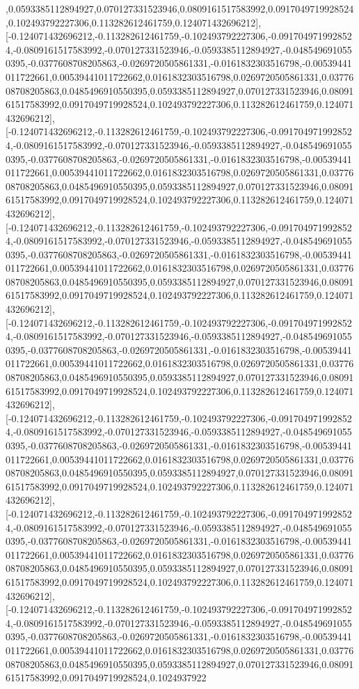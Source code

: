\documentclass{article}
\begin{document}
,0.0593385112894927,0.070127331523946,0.0809161517583992,0.0917049719928524,0.102493792227306,0.113282612461759,0.124071432696212],[-0.124071432696212,-0.113282612461759,-0.102493792227306,-0.0917049719928524,-0.0809161517583992,-0.070127331523946,-0.0593385112894927,-0.0485496910550395,-0.0377608708205863,-0.0269720505861331,-0.0161832303516798,-0.00539441011722661,0.00539441011722662,0.0161832303516798,0.0269720505861331,0.0377608708205863,0.0485496910550395,0.0593385112894927,0.070127331523946,0.0809161517583992,0.0917049719928524,0.102493792227306,0.113282612461759,0.124071432696212],[-0.124071432696212,-0.113282612461759,-0.102493792227306,-0.0917049719928524,-0.0809161517583992,-0.070127331523946,-0.0593385112894927,-0.0485496910550395,-0.0377608708205863,-0.0269720505861331,-0.0161832303516798,-0.00539441011722661,0.00539441011722662,0.0161832303516798,0.0269720505861331,0.0377608708205863,0.0485496910550395,0.0593385112894927,0.070127331523946,0.0809161517583992,0.0917049719928524,0.102493792227306,0.113282612461759,0.124071432696212],[-0.124071432696212,-0.113282612461759,-0.102493792227306,-0.0917049719928524,-0.0809161517583992,-0.070127331523946,-0.0593385112894927,-0.0485496910550395,-0.0377608708205863,-0.0269720505861331,-0.0161832303516798,-0.00539441011722661,0.00539441011722662,0.0161832303516798,0.0269720505861331,0.0377608708205863,0.0485496910550395,0.0593385112894927,0.070127331523946,0.0809161517583992,0.0917049719928524,0.102493792227306,0.113282612461759,0.124071432696212],[-0.124071432696212,-0.113282612461759,-0.102493792227306,-0.0917049719928524,-0.0809161517583992,-0.070127331523946,-0.0593385112894927,-0.0485496910550395,-0.0377608708205863,-0.0269720505861331,-0.0161832303516798,-0.00539441011722661,0.00539441011722662,0.0161832303516798,0.0269720505861331,0.0377608708205863,0.0485496910550395,0.0593385112894927,0.070127331523946,0.0809161517583992,0.0917049719928524,0.102493792227306,0.113282612461759,0.124071432696212],[-0.124071432696212,-0.113282612461759,-0.102493792227306,-0.0917049719928524,-0.0809161517583992,-0.070127331523946,-0.0593385112894927,-0.0485496910550395,-0.0377608708205863,-0.0269720505861331,-0.0161832303516798,-0.00539441011722661,0.00539441011722662,0.0161832303516798,0.0269720505861331,0.0377608708205863,0.0485496910550395,0.0593385112894927,0.070127331523946,0.0809161517583992,0.0917049719928524,0.102493792227306,0.113282612461759,0.124071432696212],[-0.124071432696212,-0.113282612461759,-0.102493792227306,-0.0917049719928524,-0.0809161517583992,-0.070127331523946,-0.0593385112894927,-0.0485496910550395,-0.0377608708205863,-0.0269720505861331,-0.0161832303516798,-0.00539441011722661,0.00539441011722662,0.0161832303516798,0.0269720505861331,0.0377608708205863,0.0485496910550395,0.0593385112894927,0.070127331523946,0.0809161517583992,0.0917049719928524,0.102493792227306,0.113282612461759,0.124071432696212],[-0.124071432696212,-0.113282612461759,-0.102493792227306,-0.0917049719928524,-0.0809161517583992,-0.070127331523946,-0.0593385112894927,-0.0485496910550395,-0.0377608708205863,-0.0269720505861331,-0.0161832303516798,-0.00539441011722661,0.00539441011722662,0.0161832303516798,0.0269720505861331,0.0377608708205863,0.0485496910550395,0.0593385112894927,0.070127331523946,0.0809161517583992,0.0917049719928524,0.1024937922
\end{document}
